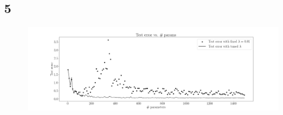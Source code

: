 \documentclass[10pt]{article}
\begin{document}
\subsection*{5}
\begin{figure}[!h]
    \begin{center}
        \includegraphics[scale = 0.25]{double_descent.png}
    \end{center}
\end{figure}
\end{document}
